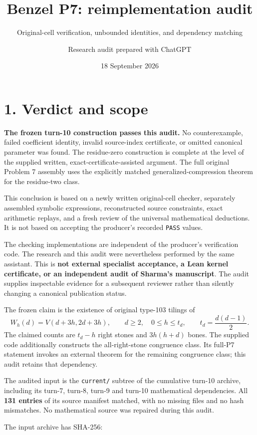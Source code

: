 \documentclass[
  11pt,
]{article}
\title{Benzel P7: reimplementation audit}
\subtitle{Original-cell verification, unbounded identities, and
dependency matching}
\author{Research audit prepared with ChatGPT}
\date{18 September 2026}
\begin{document}
\maketitle

\section{1. Verdict and scope}\label{verdict-and-scope}

\textbf{The frozen turn-10 construction passes this audit.} No
counterexample, failed coefficient identity, invalid source-index
certificate, or omitted canonical parameter was found. The residue-zero
construction is complete at the level of the supplied written,
exact-certificate-assisted argument. The full original Problem 7
assembly uses the explicitly matched generalized-compression theorem for
the residue-two class.

This conclusion is based on a newly written original-cell checker,
separately assembled symbolic expressions, reconstructed source
constraints, exact arithmetic replays, and a fresh review of the
universal mathematical deductions. It is not based on accepting the
producer's recorded \texttt{PASS} values.

The checking implementations are independent of the producer's
verification code. The research and this audit were nevertheless
performed by the same assistant. This is \textbf{not external specialist
acceptance, a Lean kernel certificate, or an independent audit of
Sharma's manuscript}. The audit supplies inspectable evidence for a
subsequent reviewer rather than silently changing a canonical
publication status.

The frozen claim is the existence of original type-103 tilings of \[
W_h(d)=V(d+3h,2d+3h),\qquad d\ge2,\quad 0\le h\le t_d,
\qquad t_d=\frac{d(d-1)}2.
\] The claimed counts are \(t_d-h\) right stones and \(3h(h+d)\) bones.
The supplied code additionally constructs the all-right-stone congruence
class. Its full-P7 statement invokes an external theorem for the
remaining congruence class; this audit retains that dependency.

The audited input is the \texttt{current/} subtree of the cumulative
turn-10 archive, including its turn-7, turn-8, turn-9 and turn-10
mathematical dependencies. All \textbf{131 entries} of its source
manifest matched, with no missing files and no hash mismatches. No
mathematical source was repaired during this audit.

The input archive has SHA-256:
\end{document}
